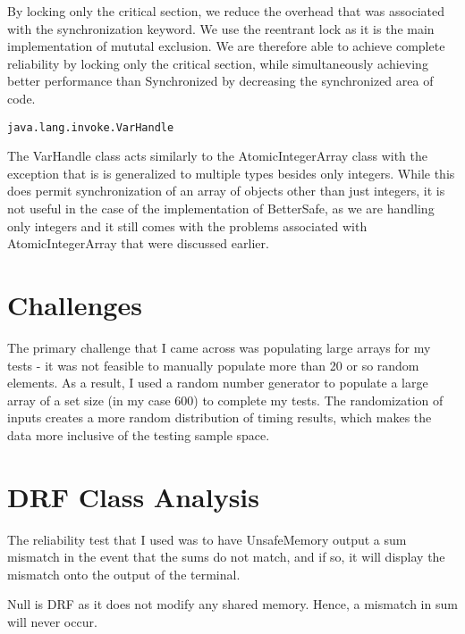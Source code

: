 By locking only the critical section, we reduce the overhead that was associated with the synchronization keyword. We use the reentrant lock as it is the main implementation of mututal exclusion. We are therefore able to achieve
complete reliability by locking only the critical section, while simultaneously achieving better performance than Synchronized by decreasing the synchronized area of code.

\begin{verbatim}
java.lang.invoke.VarHandle
\end{verbatim}
The VarHandle class acts similarly to the AtomicIntegerArray class with the exception that is is generalized to multiple types besides only integers. While this does permit synchronization of an array of objects
other than just integers, it is not useful in the case of the implementation of BetterSafe, as we are handling only integers and it still comes with the problems associated with AtomicIntegerArray that were discussed earlier.


\section{Challenges}

The primary challenge that I came across was populating large arrays for my tests - it was not feasible to manually populate more than 20 or so random elements. As a result, I used a random number generator to populate 
a large array of a set size (in my case 600) to complete my tests. The randomization of inputs creates a more random distribution of timing results, which makes the data more inclusive of the testing sample space.

\section{DRF Class Analysis}

The reliability test that I used was to have UnsafeMemory output a sum mismatch in the event that the sums do not match, and if so, it will display the mismatch onto the output of the terminal.

Null is DRF as it does not modify any shared memory. Hence, a mismatch in sum will never occur.

